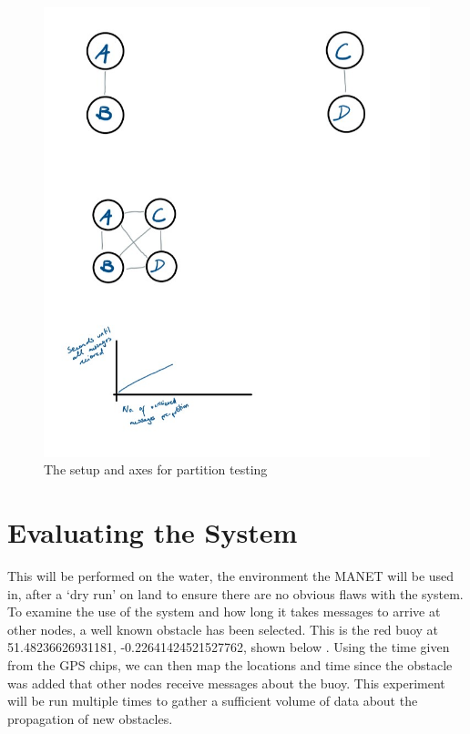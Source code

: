 \documentclass[10pt, a4paper]{article}
\begin{document}
\begin{figure}[h]
\caption{The setup and axes for partition testing}
\begin{center}
\includegraphics[scale=0.3]{partition.jpg}
\end{center}
\end{figure}



\FloatBarrier
\section{Evaluating the System}
This will be performed on the water, the environment the MANET will be used in, after a `dry run' on land to ensure there are no obvious flaws with the system. 
To examine the use of the system and how long it takes messages to arrive at other nodes, a well known obstacle has been selected. This is the red buoy at 51.48236626931181, -0.22641424521527762, shown below \cite{maps}. Using the time given from the GPS chips, we can then map the locations and time since the obstacle was added that other nodes receive messages about the buoy. This experiment will be run multiple times to gather a sufficient volume of data about the propagation of new obstacles. \\
\end{document}
